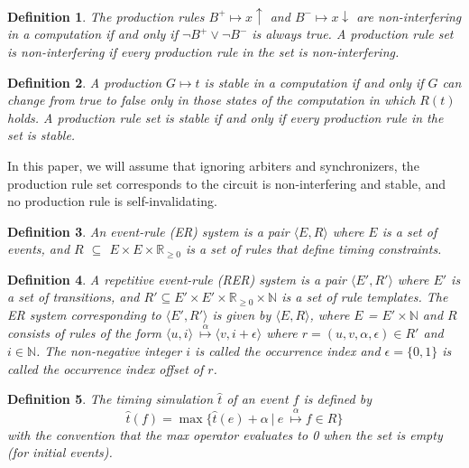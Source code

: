 \documentclass[sigconf, 10pt, twocolumn]{acmart}
\newtheorem{mydef}{Definition}
\begin{document}
\begin{mydef}
The production rules $B^{+} \stackrel{}{\mapsto} x\uparrow$ and $B^{-} \stackrel{}{\mapsto} x\downarrow$ are non-interfering in a computation if and only if $\neg B^{+} \vee \neg B^{-}$ is always true. A production rule set is non-interfering if every production rule in the set is non-interfering.
\end{mydef}
\begin{mydef}
A production $G \stackrel{}{\mapsto} t$ is stable in a computation if and only if $G$ can change from true to false only in those states of the computation in which $R(t)$ holds. A production rule set is stable if and only if every production rule in the set is stable.
\end{mydef}
In this paper, we will assume that ignoring arbiters and synchronizers, the production rule set corresponds to the circuit is non-interfering and stable, and no production rule is self-invalidating.
\begin{mydef}
An event-rule ({\it ER\/}) system is a pair $\langle E, R\rangle$ where $E$ is a set of events, and $R$ $\subseteq$ $E \times E \times \mathbb{R}_{\geq 0}$ is a set of rules that define timing constraints.
\end{mydef}
\begin{mydef}
A repetitive event-rule ({\it RER\/}) system is a pair $\langle E',
R'\rangle$ where $E'$ is a set of transitions, and $R' \subseteq E'
\times E' \times \mathbb{R}_{\geq0} \times \mathbb{N}$ is a set of
rule templates. The {\it ER\/} system corresponding to $\langle E',
R'\rangle$ is given by $\langle E, R\rangle$, where $E$ = $E' \times
\mathbb{N}$ and $R$ consists of rules of the form $\langle u, i\rangle
\ \stackrel{\alpha}{\mapsto} \langle v, i+\epsilon \rangle$ where
$r=(u,v,\alpha,\epsilon)\in R'$ and $i \in \mathbb{N}$. The non-negative integer $i$ is called the occurrence index and $\epsilon = \{0, 1\}$ is called the occurrence index offset of $r$.
\end{mydef}
\begin{mydef}
\label{def:timingsim}
The timing simulation $\hat{t}$ of an event $f$ is defined by
\begin{equation}
\hat{t}(f) = \max \{\hat{t}(e) + \alpha \ | \ e \ \stackrel{\alpha}{\mapsto} f \in R\}
\end{equation}
with the convention that the max operator evaluates to 0 when the set is empty (for initial events).
\end{mydef}
\end{document}
